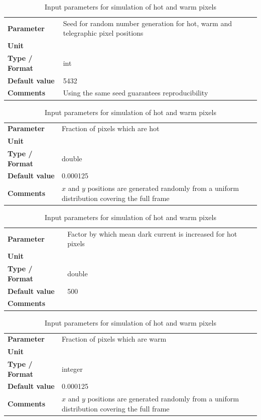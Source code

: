 \documentclass[11pt]{article}      %
\def\HCode#1{}
\def\htmlanchor#1{\HCode{<a id="#1"></a>}}
\begin{document}
\begin{table}[hb]
  \caption{Input parameters for simulation of hot and warm pixels}

  \htmlanchor{hotPixelPositionSeed}
  \begin{tabular}{| l | p{13cm} |}
    \hline 
    {\bf Parameter} & Seed for random number generation for hot, warm and telegraphic pixel positions\\
    {\bf Unit} & \\
    {\bf Type / Format} & int\\
    {\bf Default value} & 5432\\
    {\bf Comments} & Using the same seed guarantees reproducibility\\
    \hline
  \end{tabular}
  \bigskip

  \htmlanchor{fracHotPixels}
  \begin{tabular}{| l | p{13cm} |}
    \hline 
    {\bf Parameter} & Fraction of pixels which are hot\\
    {\bf Unit} & \\
    {\bf Type / Format} & double\\
    {\bf Default value} & 0.000125\\
    {\bf Comments} & $x$ and $y$ positions are generated randomly from a uniform distribution covering the full frame\\
    \hline
  \end{tabular}
  \bigskip 

  \htmlanchor{hotPixelRelativeDarkCurrent}
  \begin{tabular}{| l | p{13cm} |}
    \hline 
    {\bf Parameter} & Factor by which mean dark current is increased for hot pixels\\
    {\bf Unit} & \\
    {\bf Type / Format} & double\\
    {\bf Default value} & 500\\
    {\bf Comments} &\\
    \hline
  \end{tabular}
  \bigskip

  \htmlanchor{fracWarmPixels}
  \begin{tabular}{| l | p{13cm} |}
    \hline 
    {\bf Parameter} & Fraction of pixels which are warm\\
    {\bf Unit} & \\
    {\bf Type / Format} & integer\\
    {\bf Default value} & 0.000125\\
    {\bf Comments} & $x$ and $y$ positions are generated randomly from a uniform distribution covering the full frame\\
    \hline
  \end{tabular}
  \bigskip


\end{table}
\end{document}
